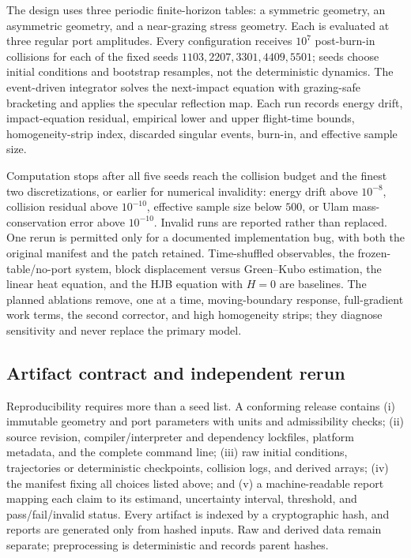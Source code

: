 \documentclass[12pt, letterpaper]{amsart}
\theoremstyle{plain}
\theoremstyle{definition}
\theoremstyle{remark}
\begin{document}
The design uses three periodic finite-horizon tables: a symmetric geometry, an
asymmetric geometry, and a near-grazing stress geometry.  Each is evaluated at
three regular port amplitudes.  Every configuration receives $10^7$
post-burn-in collisions for each of the fixed seeds
$1103,2207,3301,4409,5501$; seeds choose initial conditions and bootstrap
resamples, not the deterministic dynamics.  The event-driven integrator solves
the next-impact equation with grazing-safe bracketing and applies the specular
reflection map.  Each run records energy drift, impact-equation residual,
empirical lower and upper flight-time bounds, homogeneity-strip index, discarded
singular events, burn-in, and effective sample size.

Computation stops after all five seeds reach the collision budget and the finest
two discretizations, or earlier for numerical invalidity: energy drift above
$10^{-8}$, collision residual above $10^{-10}$, effective sample size below
$500$, or Ulam mass-conservation error above $10^{-10}$.  Invalid runs are
reported rather than replaced.  One rerun is permitted only for a documented
implementation bug, with both the original manifest and the patch retained.
Time-shuffled observables, the frozen-table/no-port system, block displacement
versus Green--Kubo estimation, the linear heat equation, and the HJB equation
with $H=0$ are baselines.  The planned ablations remove, one at a time,
moving-boundary response, full-gradient work terms, the second corrector, and
high homogeneity strips; they diagnose sensitivity and never replace the
primary model.

\subsection{Artifact contract and independent rerun}

Reproducibility requires more than a seed list.  A conforming release contains
(i) immutable geometry and port parameters with units and admissibility checks;
(ii) source revision, compiler/interpreter and dependency lockfiles, platform
metadata, and the complete command line; (iii) raw initial conditions,
trajectories or deterministic checkpoints, collision logs, and derived arrays;
(iv) the manifest fixing all choices listed above; and (v) a machine-readable
report mapping each claim to its estimand, uncertainty interval, threshold, and
pass/fail/invalid status.  Every artifact is indexed by a cryptographic hash,
and reports are generated only from hashed inputs.  Raw and derived data remain
separate; preprocessing is deterministic and records parent hashes.
\end{document}
